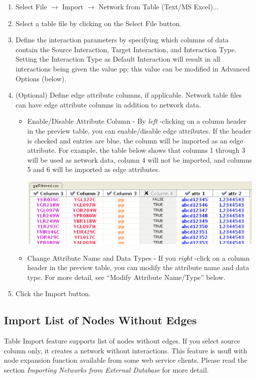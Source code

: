\begin{enumerate}
\item Select File $\rightarrow$ Import $\rightarrow$ Network from Table (Text/MS Excel)... 
\item Select a table file by clicking on the Select File button. 
\item Define the interaction parameters by specifying which columns of data contain the Source Interaction, Target Interaction, and Interaction Type. Setting the Interaction Type as Default Interaction will result in all interactions being given the value pp; this value can be modified in Advanced Options (below). 
\item (Optional) Define edge attribute columns, if applicable. Network table files can have edge attribute columns in addition to network data.
\begin{itemize}
\item Enable/Disable Attribute Column - By \emph{left}
-clicking on a column header in the preview table, you can enable/disable edge attributes. If the header is checked and entries are blue, the column will be imported as an edge attribute. For example, the table below shows that columns 1 through 3 will be used as network data, column 4 will not be imported, and columns 5 and 6 will be imported as edge attributes. 
\begin{center}
\includegraphics[width=\textwidth]{images/network_table_sample.png} 
\end{center}

\item 

 Change Attribute Name and Data Types - If you \emph{right}
-click on a column header in the preview table, you can modify the attribute name and data type. For more detail, see ``Modify Attribute Name/Type'' below. 

\end{itemize}
\item Click the Import button. 
\end{enumerate}

\subsection{Import List of Nodes Without Edges}
 Table Import feature supports list of nodes without edges. If you select source column only, it creates a network without interactions. This feature is usufl with node expansion function available from some web service clients. Please read the section \emph{Importing Networks from External Database}
 for more detail. 

